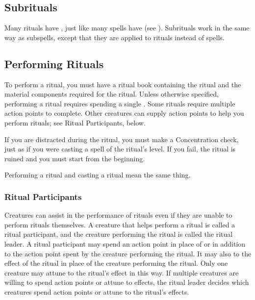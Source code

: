     \subsection{Subrituals}\label{Subrituals}
        Many rituals have , just like many spells have  (see ).
        Subrituals work in the same way as subspells, except that they are applied to rituals instead of spells.

    \subsection{Performing Rituals}
        To perform a ritual, you must have a ritual book containing the ritual and the material components required for the ritual.
        Unless otherwise specified, performing a ritual requires spending a single .
        Some rituals require multiple action points to complete.
        Other creatures can supply action points to help you perform rituals; see Ritual Participants, below.

        If you are distracted during the ritual, you must make a Concentration check, just as if you were casting a spell of the ritual's level.
        If you fail, the ritual is ruined and you must start from the beginning.
        \par Performing a ritual and casting a ritual mean the same thing.

        \subsubsection{Ritual Participants}
            Creatures can assist in the performance of rituals even if they are unable to perform rituals themselves.
            A creature that helps perform a ritual is called a ritual participant, and the creature performing the ritual is called the ritual leader.
            A ritual participant may spend an action point in place of or in addition to the action point spent by the creature performing the ritual.
            It may also  to the effect of the ritual in place of the creature performing the ritual.
            Only one creature may attune to the ritual's effect in this way.
            If multiple creatures are willing to spend action points or attune to effects, the ritual leader decides which creatures spend action points or attune to the ritual's effects.

